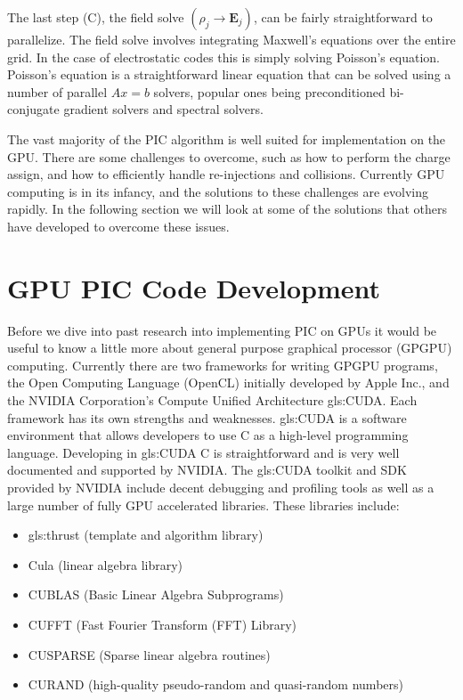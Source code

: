 The last step (C), the field solve $(\rho_j \rightarrow \mathbf{E}_j)$, can be fairly straightforward to parallelize. The field solve involves integrating Maxwell's equations over the entire grid. In the case of electrostatic codes this is simply solving Poisson's equation. Poisson's equation is a straightforward linear equation that can be solved using a number of parallel $Ax=b$ solvers, popular ones being preconditioned bi-conjugate gradient solvers and spectral solvers.

The vast majority of the PIC algorithm is well suited for implementation on the GPU. There are some challenges to overcome, such as how to perform the charge assign, and how to efficiently handle re-injections and collisions. Currently GPU computing is in its infancy, and the solutions to these challenges are evolving rapidly. In the following section we will look at some of the solutions that others have developed to overcome these issues. 

		\section{GPU PIC Code Development}
	Before we dive into past research into implementing PIC on GPUs it would be useful to know a little more about general purpose graphical processor (GPGPU) computing. Currently there are two frameworks for writing GPGPU programs, the Open Computing Language (OpenCL) initially developed by Apple Inc., and the NVIDIA Corporation's Compute Unified Architecture \gls{gls:CUDA}.\cite{NVIDIACorporation2012d,NVIDIACorporation2011} Each framework has its own strengths and weaknesses. \gls{gls:CUDA} is a software environment that allows developers to use C as a high-level programming language. Developing in \gls{gls:CUDA} C is straightforward and is very well documented and supported by NVIDIA. The \gls{gls:CUDA} toolkit and SDK provided by NVIDIA include decent debugging and profiling tools as well as a large number of fully GPU accelerated libraries. These libraries include:

\begin{itemize}
\item \gls{gls:thrust} (template and algorithm library)\cite{NVIDIACorporation2011a}
\item Cula (linear algebra library)
\item CUBLAS (Basic Linear Algebra Subprograms)\cite{NVIDIACorporation2012}
\item CUFFT (Fast Fourier Transform (FFT) Library)\cite{NVIDIACorporation2012a}
\item CUSPARSE (Sparse linear algebra routines)\cite{NVIDIACorporation2012c}
\item CURAND (high-quality pseudo-random and quasi-random numbers)\cite{NVIDIACorporation2012b}
\end{itemize}

